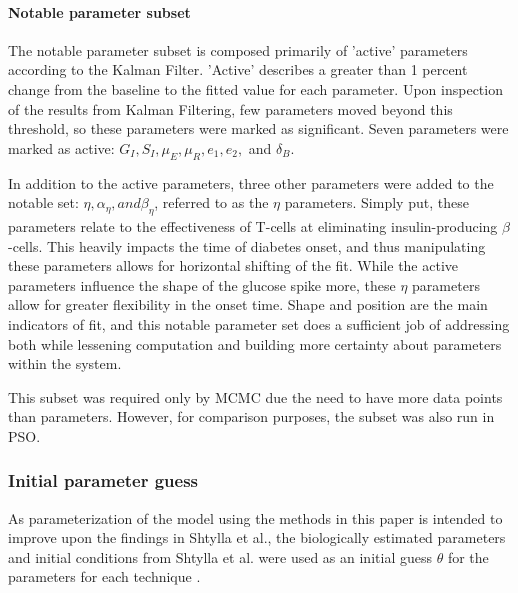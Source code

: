 \documentclass{article}
\begin{document}
\paragraph{Notable parameter subset} \label{section:Notable_parameter_subset}
The notable parameter subset is composed primarily of 'active' parameters according to the Kalman Filter. 'Active' describes a greater than 1 percent change from the baseline to the fitted value for each parameter. Upon inspection of the results from Kalman Filtering, few parameters moved beyond this threshold, so these parameters were marked as significant. Seven parameters were marked as active: $G_{I}, S_{I}, \mu_{E}, \mu_{R}, e_{1}, e_{2},$ and $\delta_{B}$.
\par In addition to the active parameters, three other parameters were added to the notable set: $\eta, \alpha_{\eta}, and \beta_{\eta}$, referred to as the $\eta$ parameters. Simply put, these parameters relate to the effectiveness of T-cells at eliminating insulin-producing $\beta$-cells. This heavily impacts the time of diabetes onset, and thus manipulating these parameters allows for horizontal shifting of the fit. While the active parameters influence the shape of the glucose spike more, these $\eta$ parameters allow for greater flexibility in the onset time. Shape and position are the main indicators of fit, and this notable parameter set does a sufficient job of addressing both while lessening computation and building more certainty about parameters within the system. 
\par This subset was required only by MCMC due the need to have more data points than parameters. However, for comparison purposes, the subset was also run in PSO. 

\subsubsection{Initial parameter guess}
As parameterization of the model using the methods in this paper is intended to improve upon the findings in Shtylla et al., the biologically estimated parameters and initial conditions from Shtylla et al. were used as an initial guess $\theta$ for the parameters for each technique \cite{shtylla2019mathematical}. 
\end{document}
